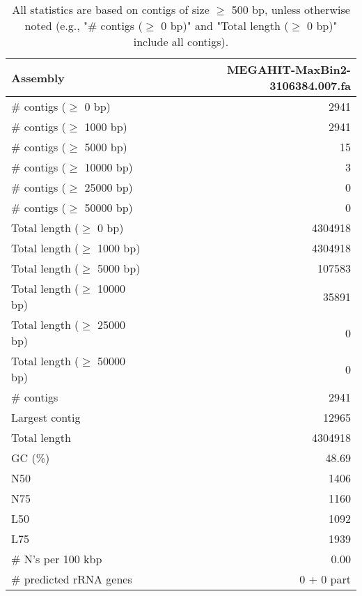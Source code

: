 \documentclass[12pt,a4paper]{article}
\begin{document}
\begin{table}[ht]
\begin{center}
\caption{All statistics are based on contigs of size $\geq$ 500 bp, unless otherwise noted (e.g., "\# contigs ($\geq$ 0 bp)" and "Total length ($\geq$ 0 bp)" include all contigs).}
\begin{tabular}{|l*{1}{|r}|}
\hline
Assembly & MEGAHIT-MaxBin2-3106384.007.fa \\ \hline
\# contigs ($\geq$ 0 bp) & 2941 \\ \hline
\# contigs ($\geq$ 1000 bp) & 2941 \\ \hline
\# contigs ($\geq$ 5000 bp) & 15 \\ \hline
\# contigs ($\geq$ 10000 bp) & 3 \\ \hline
\# contigs ($\geq$ 25000 bp) & 0 \\ \hline
\# contigs ($\geq$ 50000 bp) & 0 \\ \hline
Total length ($\geq$ 0 bp) & 4304918 \\ \hline
Total length ($\geq$ 1000 bp) & 4304918 \\ \hline
Total length ($\geq$ 5000 bp) & 107583 \\ \hline
Total length ($\geq$ 10000 bp) & 35891 \\ \hline
Total length ($\geq$ 25000 bp) & 0 \\ \hline
Total length ($\geq$ 50000 bp) & 0 \\ \hline
\# contigs & 2941 \\ \hline
Largest contig & 12965 \\ \hline
Total length & 4304918 \\ \hline
GC (\%) & 48.69 \\ \hline
N50 & 1406 \\ \hline
N75 & 1160 \\ \hline
L50 & 1092 \\ \hline
L75 & 1939 \\ \hline
\# N's per 100 kbp & 0.00 \\ \hline
\# predicted rRNA genes & 0 + 0 part \\ \hline
\end{tabular}
\end{center}
\end{table}
\end{document}
